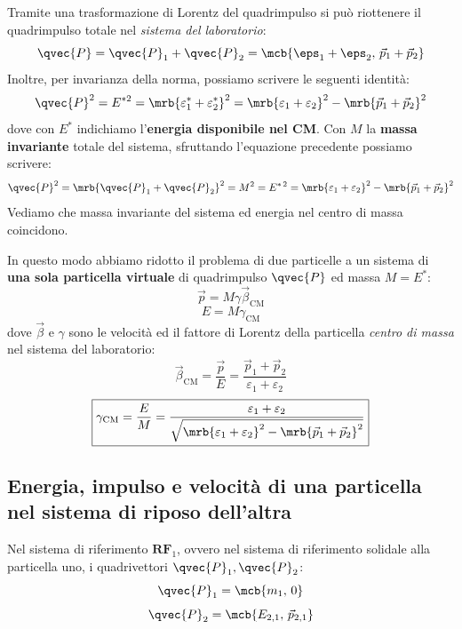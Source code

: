 Tramite una trasformazione di Lorentz del quadrimpulso si può riottenere
il quadrimpulso totale nel \textit{sistema del laboratorio}:
\begin{equation}
	\qvec{P}
	= \qvec{P}_1 + \qvec{P}_2
	= \mcb{\eps_1 + \eps_2,\, \vec{p}_1 + \vec{p}_2}
\end{equation}
Inoltre, per invarianza della norma, possiamo scrivere le seguenti
identità:
\begin{equation}
  \qvec{P}^2
	= E^{*2}
	= \mrb{\varepsilon_1^{\ast} + \varepsilon_2^{\ast}}^2
	= \mrb{\varepsilon_1 + \varepsilon_2}^2 - \mrb{\vec{p}_1 + \vec{p}_2}^2
\end{equation}
dove con $E ^{\ast}$ indichiamo l'\textbf{energia disponibile nel CM}.
Con $M$ la \textbf{massa invariante} totale del sistema, sfruttando
l'equazione precedente possiamo scrivere:
\begin{equation}
	\qvec{P}^2
	= \mrb{\qvec{P}_1 + \qvec{P}_2}^2
	= M^2
	= E^{\ast\,2}
	= \mrb{\varepsilon_1 + \varepsilon_2}^2 - \mrb{\vec{p}_1 + \vec{p}_2}^2
\end{equation}
Vediamo che massa invariante del sistema ed energia nel centro di massa
coincidono.

In questo modo abbiamo ridotto il problema di due particelle a un sistema di
\textbf{una sola particella virtuale } di quadrimpulso
$\qvec{P}$ ed massa $M = E^\ast$:
\begin{equation}
	\vec{p} = M\gamma\vec{\beta}_{\text{CM}}
\end{equation}
\begin{equation}
	E = M\gamma _{\text{CM}}
\end{equation}
dove $\vec{\beta}$ e $\gamma$ sono le velocità ed il fattore di Lorentz della
particella \textit{centro di massa} nel sistema del laboratorio:
\begin{equation}
	\boxed{\vec{\beta}_{\text{CM}}
	= \frac{\vec{p}}{E}
	= \frac{\vec{p}_1 + \vec{p}_2}{\varepsilon_1 + \varepsilon_2}}
	\label{eq:beta_CM}
\end{equation}
\begin{equation}
	\boxed{\gamma_{\text{CM}}
		= \frac{E}{M}
		= \frac{\varepsilon_1 + \varepsilon_2}{\sqrt{\mrb{\varepsilon_1 +
					\varepsilon_2}^2 - \mrb{\vec{p}_1 + \vec{p}_2}^2}}}
	\label{eq:gamma_CM}
\end{equation}

\subsection{Energia, impulso e velocità di una particella nel sistema di riposo
	dell'altra}
Nel sistema di riferimento $\textbf{RF}_1$, ovvero nel sistema di riferimento
solidale alla particella uno, i quadrivettori $\qvec{P}_1,\qvec{P}_2$:
\begin{equation}
	\qvec{P}_1 = \mcb{m_1,\, 0}
\end{equation}
\begin{equation}
	\qvec{P}_2 = \mcb{E_{2,1},\, \vec{p}_{2,1}}
\end{equation}

